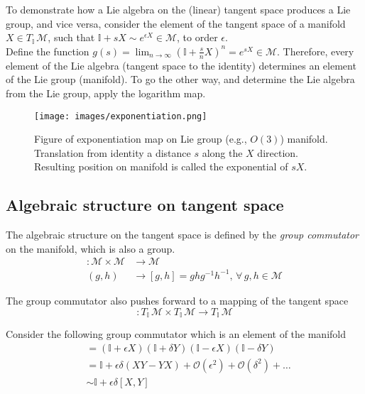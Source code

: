 \noindent To demonstrate how a Lie algebra on the (linear) tangent space produces a Lie group, and vice versa, consider the element of the tangent space of a manifold $X \in T_{\mathbb{I}} \, \mathcal{M}$, such that $\mathbb{I} + s X \sim e^{\epsilon X} \in \mathcal{M}$, to order $\epsilon$. \\

\noindent Define the function $g(s) = \lim_{n\to\infty} (\mathbb{I} + \frac{s}{n} X)^n = e^{s X} \in \mathcal{M}$. Therefore, every element of the Lie algebra (tangent space to the identity) determines an element of the Lie group (manifold). To go the other way, and determine the Lie algebra from the Lie group, apply the logarithm map.\\

\begin{figure}[H]
	\centering
	\texttt{[image: images/exponentiation.png]}
	\caption{Figure of exponentiation map on Lie group (e.g., $O(3)$) manifold. Translation from identity a distance $s$ along the $X$ direction. Resulting position on manifold is called the exponential of $s X$.}
\end{figure}

\subsection*{Algebraic structure on tangent space}

\noindent The algebraic structure on the tangent space is defined by the \textit{group commutator} on the manifold, which is also a group. 
\begin{align}
[\, , \,] : \mathcal{M} \times \mathcal{M} &\rightarrow \mathcal{M} \\
(g, h) &\rightarrow [g, h] = ghg^{-1}h^{-1}, \, \forall \, g, h \in \mathcal{M}
\end{align}

\noindent The group commutator also pushes forward to a mapping of the tangent space
\begin{equation}
[\, , \,] : T_{\mathbb{I}} \, \mathcal{M} \times T_{\mathbb{I}} \, \mathcal{M} \rightarrow T_{\mathbb{I}} \, \mathcal{M}
\end{equation}

\noindent Consider the following group commutator which is an element of the manifold
\begin{align}
[\mathbb{I} + \epsilon X, \mathbb{I} + \delta Y] &= (\mathbb{I} + \epsilon X) (\mathbb{I} + \delta Y) (\mathbb{I} - \epsilon X) (\mathbb{I} - \delta Y) \\
&= \mathbb{I} + \epsilon \delta (XY - YX) + \mathcal{O}(\epsilon^2) + \mathcal{O}(\delta^2) + \dots \\
&\sim \mathbb{I} + \epsilon \delta [X, Y]
\end{align}

